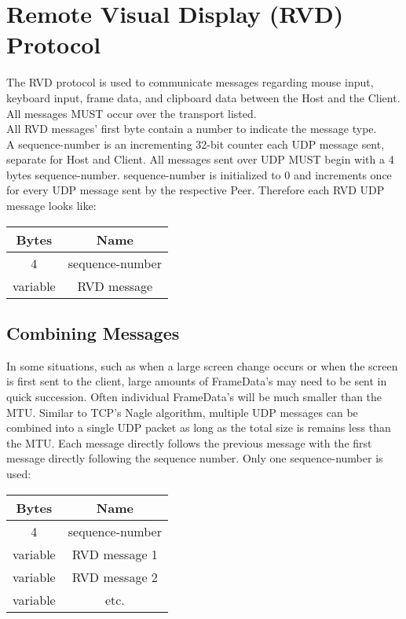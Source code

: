\section{Remote Visual Display (RVD) Protocol}

The RVD protocol is used to communicate messages regarding mouse input, keyboard input, frame data, and clipboard
data between the
Host and the Client.\\

All messages MUST occur over the transport listed.\\

All RVD messages' first byte contain a number to indicate the message type. \\

A sequence-number is an incrementing 32-bit counter each UDP message sent, separate for Host and Client. All
messages sent over UDP MUST begin with a 4 bytes sequence-number. sequence-number is initialized
to 0 and increments once for every UDP message sent by the respective Peer. Therefore each RVD UDP message looks
like:

\begin{center}
    \begin{tabular}{|c|c|}
        \hline
        \textbf{Bytes} & \textbf{Name}   \\
        \hline
        4              & sequence-number \\
        \hline
        variable       & RVD message     \\
        \hline
    \end{tabular}
\end{center}

\subsection{Combining Messages}

In some situations, such as when a large screen change occurs or when the screen is first sent to the client,
large amounts of FrameData's may need to be sent in quick succession. Often individual FrameData's
will be much smaller than the MTU. Similar to TCP's Nagle algorithm, multiple UDP messages can be combined into a
single UDP packet as long as the total size is remains less than the MTU. Each message directly follows the
previous message with the first message directly following the sequence number. Only one sequence-number
is used:

\begin{center}
    \begin{tabular}{|c|c|}
        \hline
        \textbf{Bytes} & \textbf{Name}   \\
        \hline
        4              & sequence-number \\
        \hline
        variable       & RVD message 1   \\
        \hline
        variable       & RVD message 2   \\
        \hline
        variable       & etc.            \\
        \hline
    \end{tabular}
\end{center}

